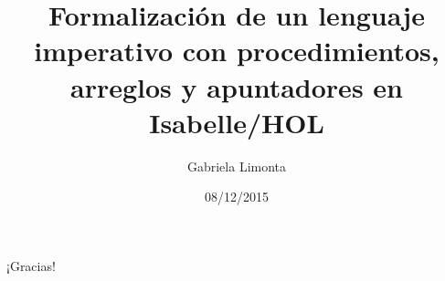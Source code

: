 \documentclass{beamer}
\title[Formalización de un lenguaje imperativo]{Formalización de un lenguaje imperativo con procedimientos, arreglos y apuntadores en Isabelle/HOL}
\author{Gabriela Limonta}
\institute[]{Universidad Simón Bolívar}
\date{08/12/2015}
\newcommand\Fontbi{\fontsize{12}{10}\selectfont}
\begin{document}
\begin{frame}
\titlepage
\end{frame}









\begin{frame}

\Fontbi

\begin{center}
¡Gracias!
\end{center}
\end{frame}
\end{document}
